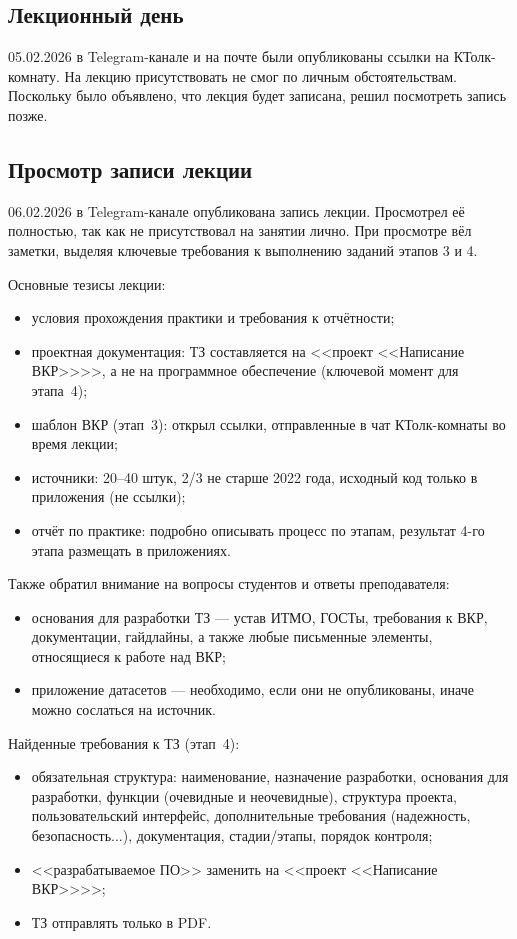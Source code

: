 \documentclass[a4paper,14pt]{extarticle}
\begin{document}
\subsection{Лекционный день}

05.02.2026 в Telegram-канале и на почте были опубликованы ссылки на КТолк-комнату. На лекцию присутствовать не смог по личным обстоятельствам. Поскольку было объявлено, что лекция будет записана, решил посмотреть запись позже.

\subsection{Просмотр записи лекции}

06.02.2026 в Telegram-канале опубликована запись лекции. Просмотрел её полностью, так как не присутствовал на занятии лично. При просмотре вёл заметки, выделяя ключевые требования к выполнению заданий этапов 3 и 4.

Основные тезисы лекции:
\begin{itemize}
  \item условия прохождения практики и требования к отчётности;
  \item проектная документация: ТЗ составляется на <<проект <<Написание ВКР>>>>, а не на программное обеспечение (ключевой момент для этапа~4);
  \item шаблон ВКР (этап~3): открыл ссылки, отправленные в чат КТолк-комнаты во время лекции;
  \item источники: 20--40 штук, 2/3 не старше 2022 года, исходный код только в приложения (не ссылки);
  \item отчёт по практике: подробно описывать процесс по этапам, результат 4-го этапа размещать в приложениях.
\end{itemize}

Также обратил внимание на вопросы студентов и ответы преподавателя:
\begin{itemize}
  \item основания для разработки ТЗ --- устав ИТМО, ГОСТы, требования к ВКР, документации, гайдлайны, а также любые письменные элементы, относящиеся к работе над ВКР;
  \item приложение датасетов --- необходимо, если они не опубликованы, иначе можно сослаться на источник.
\end{itemize}

Найденные требования к ТЗ (этап~4):
\begin{itemize}
  \item обязательная структура: наименование, назначение разработки, основания для разработки, функции (очевидные и неочевидные), структура проекта, пользовательский интерфейс, дополнительные требования (надежность, безопасность...), документация, стадии/этапы, порядок контроля;
  \item <<разрабатываемое ПО>> заменить на <<проект <<Написание ВКР>>>>;
  \item ТЗ отправлять только в PDF.
\end{itemize}
\end{document}
